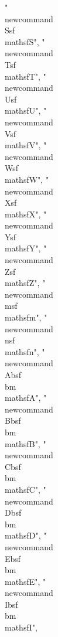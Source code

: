 {"\\newcommand{\\Ssf}{\\mathsf{S}}",
"\\newcommand{\\Tsf}{\\mathsf{T}}",
"\\newcommand{\\Usf}{\\mathsf{U}}",
"\\newcommand{\\Vsf}{\\mathsf{V}}",
"\\newcommand{\\Wsf}{\\mathsf{W}}",
"\\newcommand{\\Xsf}{\\mathsf{X}}",
"\\newcommand{\\Ysf}{\\mathsf{Y}}",
"\\newcommand{\\Zsf}{\\mathsf{Z}}",
"\\newcommand{\\msf}{\\mathsf{m}}",
"\\newcommand{\\nsf}{\\mathsf{n}}",
"\\newcommand{\\Absf}{\\bm{\\mathsf{A}}}",
"\\newcommand{\\Bbsf}{\\bm{\\mathsf{B}}}",
"\\newcommand{\\Cbsf}{\\bm{\\mathsf{C}}}",
"\\newcommand{\\Dbsf}{\\bm{\\mathsf{D}}}",
"\\newcommand{\\Ebsf}{\\bm{\\mathsf{E}}}",
"\\newcommand{\\Ibsf}{\\bm{\\mathsf{I}}}",
}
